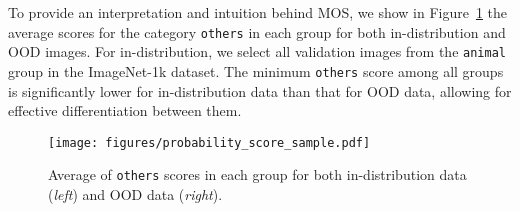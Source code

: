 \documentclass[final]{cvpr}
\begin{document}
To provide an interpretation and intuition behind MOS, we show in Figure~\ref{fig:score_dist_sample} the average scores for the category \texttt{others} in each group for both in-distribution and OOD images. For in-distribution, we select all validation images from the \texttt{animal} group in the ImageNet-1k dataset. The minimum \texttt{others} score among all groups is significantly lower for in-distribution data than that for OOD data, allowing for effective differentiation between them.  












\begin{figure}[h]
    \centering
    \texttt{[image: figures/probability\_score\_sample.pdf]}
    \caption{\small{Average of \texttt{others} scores in each group for both in-distribution data (\textit{left}) and OOD data (\textit{right}).}} \label{fig:score_dist_sample}
    \vspace{-0.4cm}
\end{figure}
\end{document}
